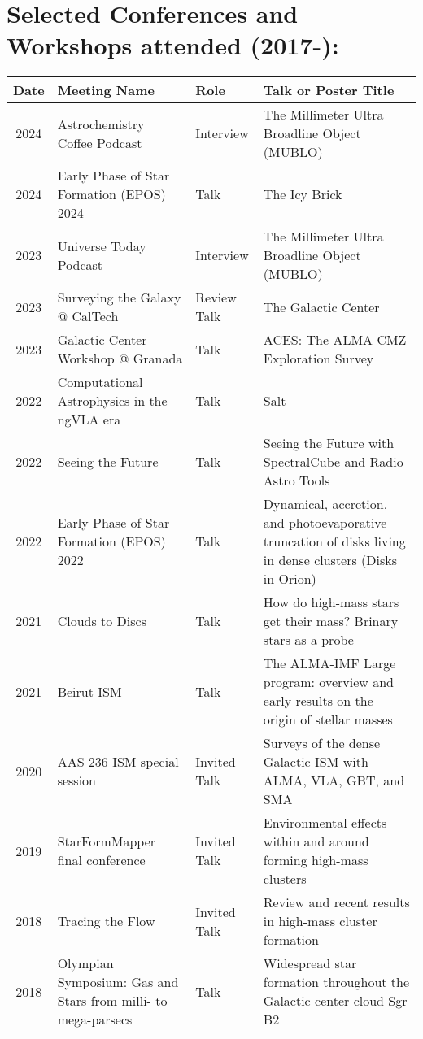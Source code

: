\clearpage
\setlength{\extrarowheight}{4pt}
\section*{Selected Conferences and Workshops attended (2017-): }
\vspace{-12pt}
\begin{tabular}{cp{1.8in}p{1.5cm}p{3.0in}}
    Date & Meeting Name & Role & Talk or Poster Title \\
                \hline
    2024 &      Astrochemistry Coffee Podcast & Interview &  The Millimeter Ultra Broadline Object (MUBLO) \\
    2024 &      Early Phase of Star Formation (EPOS) 2024 & Talk &  The Icy Brick \\
    2023 &      Universe Today Podcast & Interview & The Millimeter Ultra Broadline Object (MUBLO) \\
    2023 &      Surveying the Galaxy @ CalTech & Review Talk & The Galactic Center \\
    2023 &      Galactic Center Workshop @ Granada & Talk & ACES: The ALMA CMZ Exploration Survey \\
    2022 &      Computational Astrophysics in the ngVLA era & Talk & Salt \\
    2022 &      Seeing the Future & Talk & Seeing the Future with SpectralCube and Radio Astro Tools \\
    2022 &      Early Phase of Star Formation (EPOS) 2022 & Talk &  Dynamical, accretion, and photoevaporative truncation of disks living in dense clusters (Disks in Orion)\\
    2021 &      Clouds to Discs & Talk & How do high-mass stars get their mass? Brinary stars as a probe \\
    2021 &      Beirut ISM & Talk & The ALMA-IMF Large program: overview and early results on the origin of stellar masses \\
    2020 &      AAS 236 ISM special session & Invited Talk &  Surveys of the dense Galactic ISM with ALMA, VLA, GBT, and SMA \\
    2019 &      StarFormMapper final conference & Invited Talk & Environmental effects within and around forming high-mass clusters \\
    2018 &      Tracing the Flow & Invited Talk & Review and recent results in high-mass cluster formation \\
    2018 &      Olympian Symposium: Gas and Stars from milli- to mega-parsecs & Talk & 	Widespread star formation throughout the Galactic center cloud Sgr B2 \\

\end{tabular}
